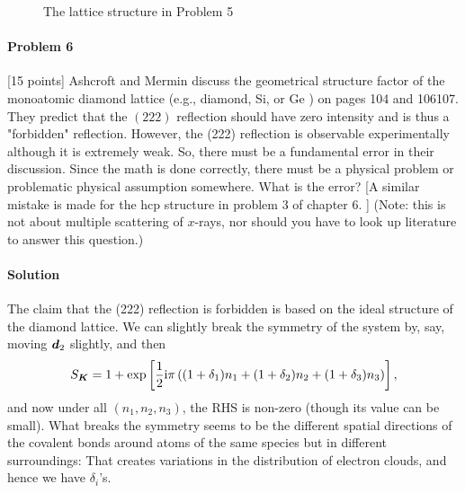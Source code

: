 \documentclass[hyperref, a4paper]{article}
\newcommand*{\ii}{\mathrm{i}}
\begin{document}
\begin{figure}
    \centering
    
    \caption{The lattice structure in Problem 5}
\end{figure}

\paragraph{Problem 6} [15 points] Ashcroft and Mermin discuss the geometrical structure factor of the monoatomic diamond lattice (e.g., diamond, Si, or $\mathrm{Ge}$ ) on pages 104 and 106107. They predict that the $(222)$ reflection should have zero intensity and is thus a "forbidden" reflection. However, the (222) reflection is observable experimentally although it is extremely weak. So, there must be a fundamental error in their discussion. Since the math is done correctly, there must be a physical problem or problematic physical assumption somewhere. What is the error? [A similar mistake is made for the hcp structure in problem 3 of chapter $6 .$ ] (Note: this is not about multiple scattering of $x$-rays, nor should you have to look up literature to answer this question.)

\paragraph{Solution} The claim that the (222) reflection is forbidden 
is based on the ideal structure of the diamond lattice.
We can slightly break the symmetry of the system by, say,
moving $\vb*{d}_2$ slightly, and then 
\[
    S_{\vb*{K}}=1+\exp \left[\frac{1}{2} \ii \pi\left( (1 + \delta_1) n_1+ (1 + \delta_2) n_2+ (1 + \delta_3) n_3\right)\right],
\]
and now under all $(n_1, n_2, n_3)$,
the RHS is non-zero (though its value can be small).
What breaks the symmetry seems to be the different spatial directions of the covalent bonds
around atoms of the same species but in different surroundings:
That creates variations in the distribution of electron clouds,
and hence we have $\delta_i$'s.
\end{document}
